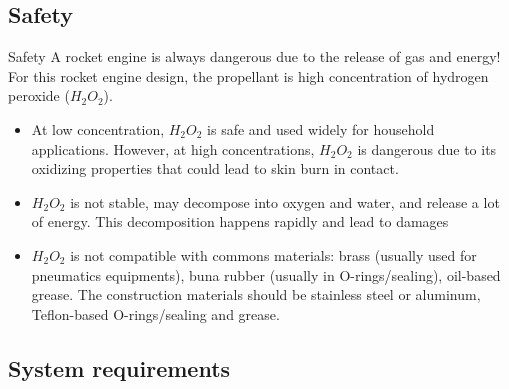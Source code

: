 \documentclass{beamer}
\begin{document}
\subsection{Safety}
\begin{frame}{Safety}
    A rocket engine is always dangerous due to the release of gas and energy! 
    For this rocket engine design, the propellant is high concentration of hydrogen peroxide  ($H_2O_2$). 
    \begin{itemize}
        \item At low concentration, $H_2O_2$ is safe and used widely for household applications. However, at high concentrations, $H_2O_2$ is dangerous due to its oxidizing properties that could lead to skin burn in contact.
        \item $H_2O_2$ is not stable, may decompose into oxygen and water, and release a lot of energy. This decomposition happens rapidly and lead to damages
        \item $H_2O_2$ is not compatible with commons materials: brass (usually used for pneumatics equipments), buna rubber (usually in O-rings/sealing), oil-based grease. The construction materials should be stainless steel or aluminum, Teflon-based O-rings/sealing and grease.
    \end{itemize}
\end{frame}

\subsection{System requirements}
\end{document}
